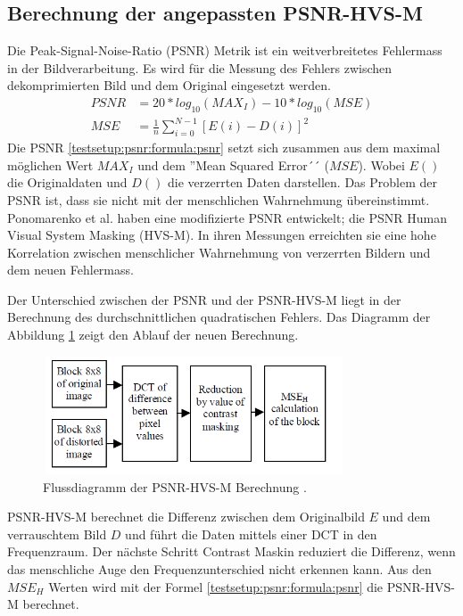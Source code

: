 \subsection{Berechnung der angepassten PSNR-HVS-M}\label{testsetup:psnr}
Die Peak-Signal-Noise-Ratio (PSNR) Metrik ist ein weitverbreitetes Fehlermass in der Bildverarbeitung. Es wird für die Messung des Fehlers zwischen dekomprimierten Bild und dem Original eingesetzt werden. 
\begin{equation} \label{testsetup:psnr:formula:psnr}
\begin{split}
PSNR & = 20 * log_{10}(MAX_I) - 10*log_{10}(MSE) \\
MSE & = \frac{1}{n}\sum_{i=0}^{N-1}[E(i)-D(i)]^2
\end{split}
\end{equation}
Die PSNR \eqref{testsetup:psnr:formula:psnr} setzt sich zusammen aus dem maximal möglichen Wert $MAX_I$ und dem ''Mean Squared Error´´ ($MSE$). Wobei $E()$ die Originaldaten und $D()$ die verzerrten Daten darstellen. Das Problem der PSNR ist, dass sie nicht mit der menschlichen Wahrnehmung übereinstimmt. Ponomarenko et al.  \cite{ponomarenko2007between:psnr} haben eine modifizierte PSNR entwickelt; die PSNR Human Visual System Masking (HVS-M). In ihren Messungen erreichten sie eine hohe Korrelation zwischen menschlicher Wahrnehmung von verzerrten Bildern und dem neuen Fehlermass.

Der Unterschied zwischen der PSNR und der PSNR-HVS-M liegt in der Berechnung des durchschnittlichen quadratischen Fehlers. Das Diagramm der Abbildung \ref{testsetup:ablauf:psnr:flowchart} zeigt den Ablauf der neuen Berechnung.\\
\begin{figure}[!htbp]
	\center
	\includegraphics[width=0.8\textwidth,height=3.5cm,keepaspectratio]{./pictures/testsetup/psnr-hvs-m-flow.png}
	\caption{Flussdiagramm der PSNR-HVS-M Berechnung \cite{ponomarenko2007between:psnr}.}
	\label{testsetup:ablauf:psnr:flowchart}
\end{figure}
PSNR-HVS-M berechnet die Differenz zwischen dem Originalbild $E$ und dem verrauschtem Bild $D$ und führt die Daten mittels einer DCT in den Frequenzraum. Der nächste Schritt Contrast Maskin reduziert die Differenz, wenn das menschliche Auge den Frequenzunterschied nicht erkennen kann. Aus den $MSE_H$ Werten wird mit der Formel \eqref{testsetup:psnr:formula:psnr} die PSNR-HVS-M berechnet.

